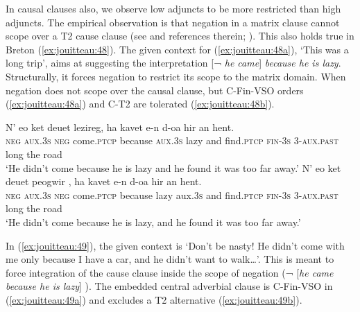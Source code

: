 \documentclass[output=paper,colorlinks,citecolor=brown]{langscibook}
\begin{document}
In causal clauses also, we observe low adjuncts to be more restricted than high adjuncts. The empirical observation is that negation in a matrix clause cannot scope over a T2 cause clause (see \citealt{mj:deHaan2001, mj:Heycock2006, mj:Haegeman2012} and references therein; \citealt{mj:Holmberg2015}). This also holds true in Breton (\ref{ex:jouitteau:48}). The given context for (\ref{ex:jouitteau:48a}), ‘This was a long trip’, aims at suggesting the interpretation [¬ \textit{he came}] \textit{because he is lazy}. Structurally, it forces negation to restrict its scope to the matrix domain. When negation does not scope over the causal clause, but C-Fin-VSO orders (\ref{ex:jouitteau:48a}) and C-T2 are tolerated (\ref{ex:jouitteau:48b}).

\ea \label{ex:jouitteau:48}
\ea \label{ex:jouitteau:48a}
\gll N’   eo          ket  deuet   {} lezireg, ha kavet        e-n d-oa  hir an hent.   \\
\textsc{neg} \textsc{aux.3s} \textsc{neg} come\textsc{.ptcp} because \textsc{aux.3s}  lazy     and find\textsc{.ptcp} \textsc{fin}-\textsc{3s} 3\textsc{-aux.past} long the road \\
\glt `He didn’t come because he is lazy and he found it was too far away.’
\ex \label{ex:jouitteau:48b}
\gll N’   eo ket deuet  peogwir  {},  ha   kavet e-n d-oa hir an hent. \\ 
\textsc{neg} \textsc{aux.3s} \textsc{neg} come\textsc{.ptcp} because lazy     aux\textsc{.3s} and find\textsc{.ptcp} \textsc{fin}-3\textsc{s} 3\textsc{-aux.past} long the road \\
\glt `He didn’t come because he is lazy, and he found it was too far away.’ 
\z
\z 

In (\ref{ex:jouitteau:49}), the given context is ‘Don’t be nasty! He didn’t come with me only because I have a car, and he didn’t want to walk…’. This is meant to force integration of the cause clause inside the scope of negation (¬ [\textit{he came because he is lazy}] ). The embedded central adverbial clause is C-Fin-VSO in (\ref{ex:jouitteau:49a}) and excludes a T2 alternative (\ref{ex:jouitteau:49b}).

\ea \label{ex:jouitteau:49}
\z\z 
\end{document}
